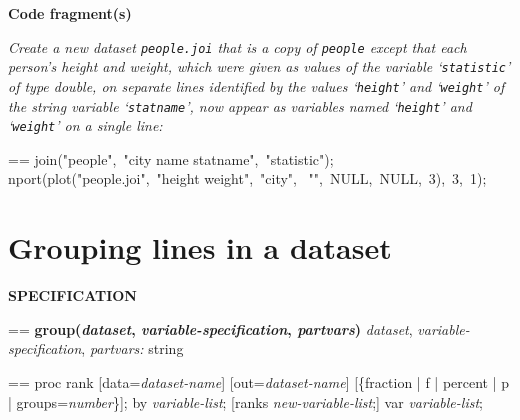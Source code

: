 \documentclass{book}
\makeatletter
\newcommand\Texinfocommandstyletextvar[1]{{\normalfont{}\textsl{#1}}}%
\newenvironment{Texinfopreformatted}{%
  \par\GNUTobeylines\obeyspaces\frenchspacing\parskip=\z@\parindent=\z@}{}
{\catcode`\^^M=13 \gdef\GNUTobeylines{\catcode`\^^M=13 \def^^M{\null\par}}}
\newenvironment{Texinfoindented}{\begin{list}{}{}\item\relax}{\end{list}}
\renewcommand{\_}{\Texinfounderscore\discretionary{}{}{}}
\makeatother
\begin{document}
\noindent{}\textbf{Code fragment(s)}

\emph{Create a new dataset \texttt{people.joi} that is a copy of
\texttt{people} except that each person's height and weight, which were
given as values of the variable `\texttt{statistic}' of type double,
on separate lines identified by the values `\texttt{height}' and `\texttt{weight}'
of the string variable `\texttt{statname}', now appear as variables named
`\texttt{height}' and `\texttt{weight}' on a single line:}
\begin{Texinfoindented}
\begin{Texinfopreformatted}%
\ttfamily join("people",\ "city name statname",\ "statistic");
nport(plot("people.joi",\ "height weight",\ "city",
\            "",\ NULL,\ NULL,\ 3),\ 3,\ 1);
\end{Texinfopreformatted}
\end{Texinfoindented}

\section{{Grouping lines in a dataset}}
\label{anchor:Grouping-lines-in-a-dataset}%

\noindent{}\textbf{SPECIFICATION}
\begin{Texinfoindented}
\begin{Texinfopreformatted}%
\textbf{group(\Texinfocommandstyletextvar{dataset}, \Texinfocommandstyletextvar{variable-specification}, \Texinfocommandstyletextvar{partvars})}
\Texinfocommandstyletextvar{dataset}, \Texinfocommandstyletextvar{variable-specification}, \Texinfocommandstyletextvar{partvars:} string
\end{Texinfopreformatted}
\end{Texinfoindented}

\begin{Texinfoindented}
\begin{Texinfopreformatted}%
proc rank [data=\Texinfocommandstyletextvar{dataset-name}] [out=\Texinfocommandstyletextvar{dataset-name}]
          [\{fraction | f | percent | p | groups=\Texinfocommandstyletextvar{number}\}];
by \Texinfocommandstyletextvar{variable-list};
[ranks \Texinfocommandstyletextvar{new-variable-list};]
var \Texinfocommandstyletextvar{variable-list};

\end{Texinfopreformatted}
\end{Texinfoindented}

%
%
%
\end{document}

